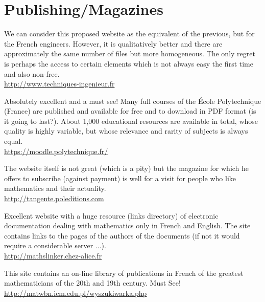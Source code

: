 	\pagebreak
	\section{Publishing/Magazines}

	{\Large {}}{\Large {}}{\Large {}}{\Large {}}{\Large {}}\bcdfrance{} We can consider this proposed website as the equivalent of the previous, but for the French engineers. However, it is qualitatively better and there are approximately the same number of files but more homogeneous. The only regret is perhaps the access to certain elements which is not always easy the first time and also non-free.\\
	\href{http://www.techniques-ingenieur.fr}{\color{blue} http://www.techniques-ingenieur.fr}
	
	{\Large {}}{\Large {}}{\Large {}}{\Large {}}\bcdfrance{} Absolutely excellent and a must see! Many full courses of the École Polytechnique (France) are published and available for free and to download in PDF format (is it going to last?). About 1,000 educational resources are available in total, whose quality is highly variable, but whose relevance and rarity of subjects is always equal.\\
	\href{https://moodle.polytechnique.fr}{\color{blue} https://moodle.polytechnique.fr/}
	
	{\Large {}}{\Large {}}{\Large {}}{\Large {}}\bcdfrance{}  The website itself is not great (which is a pity) but the magazine for which he offers to subscribe (against payment) is well for a visit for people who like mathematics and their actuality.\\
	\href{http://tangente.poleditions.com}{\color{blue}http://tangente.poleditions.com}
	
	{\Large {}}{\Large {}}{\Large {}}{\Large {}}\bcdfrance{} Excellent website with a huge resource (links directory) of electronic documentation dealing with mathematics only in French and English. The site contains links to the pages of the authors of the documents (if not it would require a considerable server ...).\\
	\href{http://mathslinker.chez-alice.fr}{\color{blue}http://mathslinker.chez-alice.fr}
	
	{\Large {}}\bcdfrance{} This site contains an on-line library of publications in French of the greatest mathematicians of the 20th and 19th century. Must See!\\
	\href{http://matwbn.icm.edu.pl/wyszukiwarka.php}{\color{blue}http://matwbn.icm.edu.pl/wyszukiwarka.php}
	
